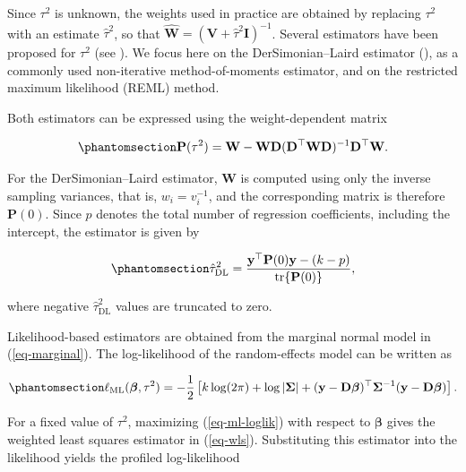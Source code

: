 \documentclass[
  man,
  longtable,
  nolmodern,
  notxfonts,
  notimes,
  colorlinks=true,linkcolor=blue,citecolor=blue,urlcolor=blue]{apa7}
\begin{document}
Since \(\tau^2\) is unknown, the weights used in practice are obtained
by replacing \(\tau^2\) with an estimate \(\hat{\tau}^2\), so that
\(\hat{\mathbf{W}} = (\mathbf{V}+\hat{\tau}^2\mathbf{I})^{-1}\). Several
estimators have been proposed for \(\tau^2\) (see
). We focus here on
the DerSimonian--Laird estimator
(), as a commonly used
non-iterative method-of-moments estimator, and on the restricted maximum
likelihood (REML) method.

Both estimators can be expressed using the weight-dependent matrix

\begin{equation}\phantomsection\label{eq-het-p}{
\mathbf{P}(\tau^2)
=
\mathbf{W}
-
\mathbf{W}\mathbf{D}
(\mathbf{D}^{\top}\mathbf{W}\mathbf{D})^{-1}
\mathbf{D}^{\top}\mathbf{W}.
}\end{equation}

For the DerSimonian--Laird estimator, \(\mathbf{W}\) is computed using
only the inverse sampling variances, that is, \(w_i = v_i^{-1}\), and
the corresponding matrix is therefore \(\mathbf{P}(0)\). Since \(p\)
denotes the total number of regression coefficients, including the
intercept, the estimator is given by

\begin{equation}\phantomsection\label{eq-het-dl}{
\hat{\tau}^2_{\mathrm{DL}}
=
\frac{
\mathbf{y}^{\top}\mathbf{P}(0)\mathbf{y} - (k-p)
}{
\operatorname{tr}\{\mathbf{P}(0)\}
},
}\end{equation}

where negative \(\hat{\tau}^2_{\mathrm{DL}}\) values are truncated to
zero.

Likelihood-based estimators are obtained from the marginal normal model
in (\ref{eq-marginal}). The log-likelihood of the random-effects model
can be written as

\begin{equation}\phantomsection\label{eq-ml-loglik}{
\ell_{\mathrm{ML}}(\boldsymbol{\beta}, \tau^2)
=
-\frac{1}{2}
\left[
k\log(2\pi)
+
\log|\boldsymbol{\Sigma}|
+
(\mathbf{y}-\mathbf{D}\boldsymbol{\beta})^{\top}
\boldsymbol{\Sigma}^{-1}
(\mathbf{y}-\mathbf{D}\boldsymbol{\beta})
\right].
}\end{equation}

For a fixed value of \(\tau^2\), maximizing (\ref{eq-ml-loglik}) with
respect to \(\boldsymbol{\beta}\) gives the weighted least squares
estimator in (\ref{eq-wls}). Substituting this estimator into the
likelihood yields the profiled log-likelihood
\end{document}
